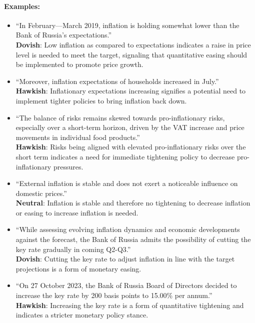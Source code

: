 \paragraph{Examples:}
\begin{itemize}
    \item ``In February—March 2019, inflation is holding somewhat lower than the Bank of Russia’s expectations.''\\
    \textbf{Dovish}: Low inflation as compared to expectations indicates a raise in price level is needed to meet the target, signaling that quantitative easing should be implemented to promote price growth. 
    
    \item ``Moreover, inflation expectations of households increased in July.''\\
    \textbf{Hawkish}: Inflationary expectations increasing signifies a potential need to implement tighter policies to bring inflation back down.

    \item ``The balance of risks remains skewed towards pro-inflationary risks, especially over a short-term horizon, driven by the VAT increase and price movements in individual food products.''\\
    \textbf{Hawkish}: Risks being aligned with elevated pro-inflationary risks over the short term indicates a need for immediate tightening policy to decrease pro-inflationary pressures.

    \item ``External inflation is stable and does not exert a noticeable influence on domestic prices.''\\
    \textbf{Neutral}: Inflation is stable and therefore no tightening to decrease inflation or easing to increase inflation is needed. 
    
    \item ``While assessing evolving inflation dynamics and economic developments against the forecast, the Bank of Russia admits the possibility of cutting the key rate gradually in coming Q2-Q3.''\\
    \textbf{Dovish}: Cutting the key rate to adjust inflation in line with the target projections is a form of monetary easing.
    
    \item ``On 27 October 2023, the Bank of Russia Board of Directors decided to increase the key rate by 200 basis points to 15.00\% per annum.''\\
    \textbf{Hawkish}: Increasing the key rate is a form of quantitative tightening and indicates a stricter monetary policy stance.
    

\end{itemize}
